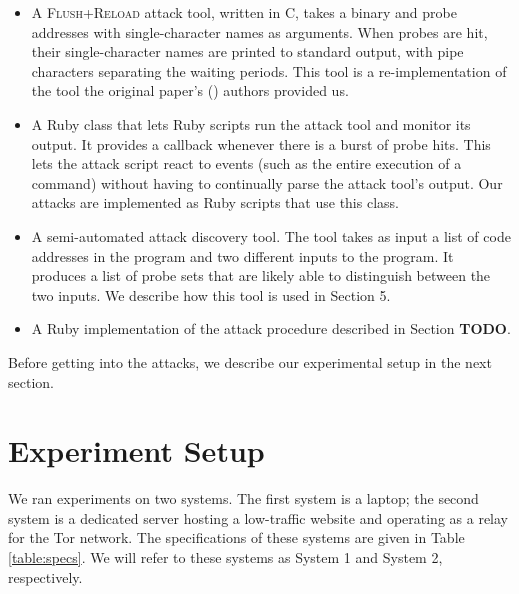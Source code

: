 \documentclass[letterpaper,twocolumn,10pt]{article}
\begin{document}
\begin{itemize}
    \item A \textsc{Flush+Reload} attack tool, written in C, takes a binary and probe
        addresses with single-character names as arguments. When probes are hit,
        their single-character names are printed to standard output, with pipe
        characters separating the waiting periods. This tool is
        a re-implementation of the tool the original paper's
        (\cite{yarom2013flush}) authors provided us.

    \item A Ruby class that lets Ruby scripts run the attack tool and monitor
        its output. It provides a callback whenever there is a burst of probe
        hits. This lets the attack script react to events (such as the entire
        execution of a command) without having to continually parse the attack
        tool's output. Our attacks are implemented as Ruby scripts that use this
        class.

    \item A semi-automated attack discovery tool. The tool takes as input a list
        of code addresses in the program and two different inputs to the
        program. It produces a list of probe sets that are likely able to
        distinguish between the two inputs. We describe how this tool is used in
        Section 5.

    \item A Ruby implementation of the attack procedure described in Section
          \textbf{TODO}.
\end{itemize}

Before getting into the attacks, we describe our experimental setup in the next
section.

\section{Experiment Setup}

We ran experiments on two systems. The first system is a laptop; the second
system is a dedicated server hosting a low-traffic website and operating as
a relay for the Tor network. The specifications of these systems are given in
Table \ref{table:specs}. We will refer to these systems as System 1 and System
2, respectively.
\end{document}
